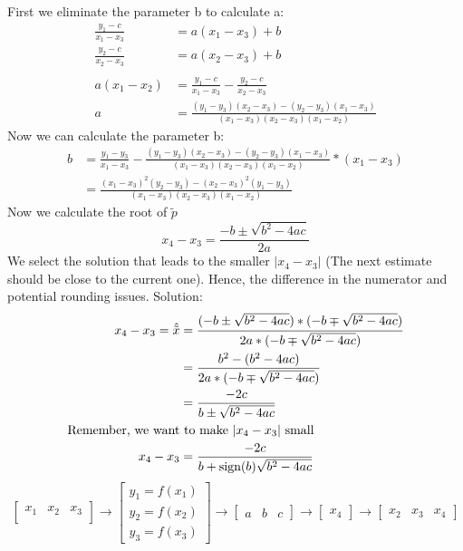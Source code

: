 First we eliminate the parameter b to calculate a:
\begin{align*}
    \frac{y_1-c}{x_1-x_3}&=a(x_1-x_3)+b\\
    \frac{y_2-c}{x_2-x_3}&=a(x_2-x_3)+b\\
    \\
    a(x_1-x_2)&=\frac{y_1-c}{x_1-x_3}-\frac{y_2-c}{x_2-x_3}\\
    a&=\frac{(y_1-y_3)(x_2-x_3)-(y_2-y_3)(x_1-x_3)}{(x_1-x_3)(x_2-x_3)(x_1-x_2)}
\end{align*}
Now we can calculate the parameter b:
\begin{align*}
    b &= \frac{y_1-y_3}{x_1-x_3}-\frac{(y_1-y_3)(x_2-x_3)-(y_2-y_3)(x_1-x_3)}
    {(x_1-x_3)(x_2-x_3)(x_1-x_2)}*(x_1-x_3)\\
    &=\frac{(x_1-x_3)^2(y_2-y_3)-(x_2-x_3)^2(y_1-y_3)}{(x_1-x_3)(x_2-x_3)(x_1-x_2)}
\end{align*}
Now we calculate the root of $\tilde{p}$
\begin{equation*}
    x_4-x_3=\frac{-b \pm \sqrt{b^2-4ac}}{2a}
\end{equation*}
We select the solution that leads to the smaller $\lvert x_4- x_3 \rvert$ (The next estimate should be close to the current one).
Hence, the difference in the numerator and potential rounding issues.
Solution:
\begin{align*}
    x_4-x_3 = \hat{\tilde{x}} &= \cfrac{(-b \pm \sqrt {b^2-4ac})*(-b \mp \sqrt{b^2-4ac})}{2a*(-b \mp \sqrt {b^2-4ac})}\\
    &=\frac{b^2-(b^2-4ac)}{2a*(-b \mp \sqrt{b^2-4ac})}\\
    &=\frac{-2c}{b \pm \sqrt {b^2-4ac}}\\
    \text{Remember, we want} &\text{ to make $\lvert x_4-x_3 \rvert$ small}\\
    x_4-x_3&= \frac{-2c}{b+\text{sign}(b)\sqrt {b^2-4ac}}
\end{align*}
\begin{equation*}
    \begin{bmatrix}
        x_1 & x_2 & x_3\\
    \end{bmatrix}
    \to
    \begin{bmatrix*}
        y_1=f(x_1)\\
        y_2=f(x_2)\\
        y_3=f(x_3)
    \end{bmatrix*}
    \to
    \begin{bmatrix*}
        a &b &c
    \end{bmatrix*}
    \to
    \begin{bmatrix*}
        x_4
    \end{bmatrix*}
    \to
    \begin{bmatrix*}
        x_2 &x_3 &x_4
    \end{bmatrix*}
\end{equation*}


